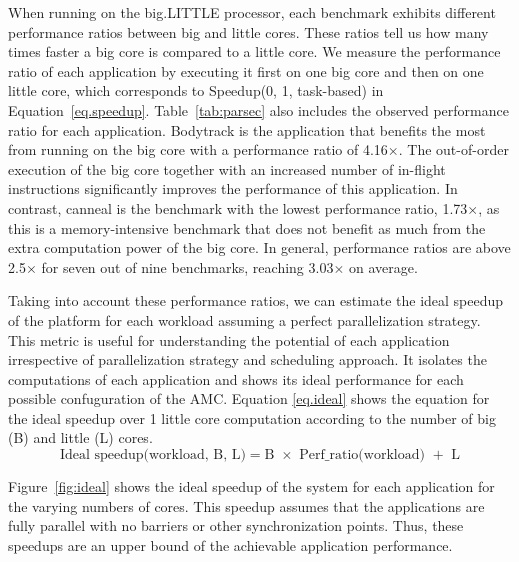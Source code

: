 When running on the big.LITTLE processor, each benchmark exhibits different performance ratios between big and little cores. These ratios tell us how many times faster a big core is compared to a little core. We measure the performance ratio of each application by executing it first on one big core and then on one little core, which corresponds to Speedup(0, 1, task-based) in Equation~\ref{eq.speedup}. 
Table~\ref{tab:parsec} also includes the observed performance ratio for each application. Bodytrack is the application that benefits the most from running on the big core with a performance ratio of 4.16$\times$. The out-of-order execution of the big core together with an increased number of in-flight instructions significantly improves the performance of this application. In contrast, canneal is the benchmark with the lowest performance ratio, 1.73$\times$, as this is a memory-intensive benchmark that does not benefit as much from the extra computation power of the big core. In general, performance ratios are above 2.5$\times$ for seven out of nine benchmarks, reaching 3.03$\times$ on average. 


Taking into account these performance ratios, we can estimate the ideal speedup of the platform for each workload assuming a perfect parallelization strategy. 
This metric is useful for understanding the potential of each application irrespective of parallelization strategy and scheduling approach. 
It isolates the computations of each application and shows its ideal performance for each possible confuguration of the AMC.
Equation \ref{eq.ideal} shows the equation for the ideal speedup over 1 little core computation according to the number of big (B) and little (L) cores.
\begingroup\makeatletter\def\f@size{8}\check@mathfonts
\begin{equation}
  \text{Ideal speedup(workload, B, L)} = \text{B $\times$ Perf\_ratio(workload) $+$ L}
\label{eq.ideal}
\end{equation}
\endgroup


Figure~\ref{fig:ideal} shows the ideal speedup of the system for each application for the varying numbers of cores. 
This speedup assumes that the applications are fully parallel with no barriers or other synchronization points. 
Thus, these speedups are an upper bound of the achievable application performance.
